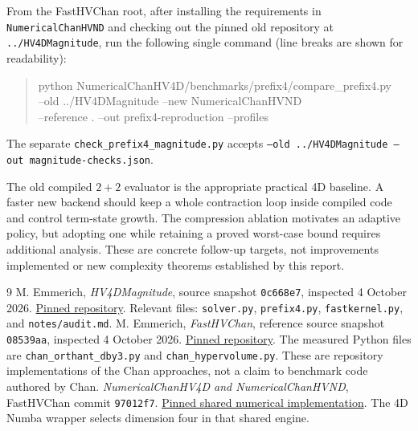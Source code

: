 \documentclass[12pt,a4paper]{article}
\begin{document}
From the FastHVChan root, after installing the requirements in
\texttt{NumericalChanHVND} and checking out the pinned old repository at
\texttt{../HV4DMagnitude}, run the following single command (line breaks
are shown for readability):
\begin{quote}\small\ttfamily
python NumericalChanHV4D/benchmarks/prefix4/compare\_prefix4.py\\
\hspace*{1em}--old ../HV4DMagnitude --new NumericalChanHVND\\
\hspace*{1em}--reference . --out prefix4-reproduction --profiles
\end{quote}
The separate \texttt{check\_prefix4\_magnitude.py} accepts
\texttt{--old ../HV4DMagnitude --out magnitude-checks.json}.

The old compiled $2+2$ evaluator is the appropriate practical 4D baseline.
A faster new backend should keep a whole contraction loop inside compiled code
and control term-state growth. The compression ablation motivates an adaptive
policy, but adopting one while retaining a proved worst-case bound requires
additional analysis. These are concrete follow-up targets, not improvements
implemented or new complexity theorems established by this report.

\begin{thebibliography}{9}
 M. Emmerich, \emph{HV4DMagnitude}, source snapshot
\texttt{0c668e7}, inspected 4 October 2026.
\href{https://github.com/emmerichmtm/HV4DMagnitude/tree/0c668e76520201f41ac0f144caa8d468d6c84e86}{Pinned repository}.
Relevant files: \texttt{solver.py}, \texttt{prefix4.py}, \texttt{fastkernel.py},
and \texttt{notes/audit.md}.
 M. Emmerich, \emph{FastHVChan}, reference source snapshot
\texttt{08539aa}, inspected 4 October 2026.
\href{https://github.com/emmerichmtm/FastHVChan/tree/08539aa99e94e181d7230a8288885b3294621c9e}{Pinned repository}.
The measured Python files are \texttt{chan\_orthant\_dby3.py} and
\texttt{chan\_hypervolume.py}. These are repository implementations of the
Chan approaches, not a claim to benchmark code authored by Chan.
 \emph{NumericalChanHV4D and NumericalChanHVND},
FastHVChan commit \texttt{97012f7}.
\href{https://github.com/emmerichmtm/FastHVChan/tree/97012f7/NumericalChanHVND}{Pinned shared numerical implementation}.
The 4D Numba wrapper selects dimension four in that shared engine.
\end{thebibliography}
\end{document}
